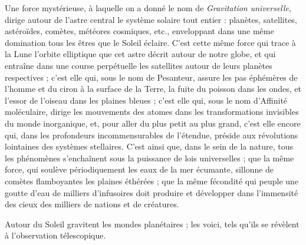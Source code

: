 \documentclass[a4paper, 11pt, oneside]{article}
\begin{document}
Une force mystérieuse, à laquelle on a donné le nom de \emph{Gravitation universelle}, dirige autour de l'astre central le système solaire tout entier : planètes, satellites, astéroïdes, comètes, météores cosmiques, etc., enveloppant dans une même domination tous les êtres que le Soleil éclaire. C'est cette même force qui trace à la Lune l'orbite elliptique que cet astre décrit autour de notre globe, et qui entraîne dans une course perpétuelle les satellites autour de leurs planètes respectives ; c'est elle qui, sous le nom de Pesanteur, assure les pas éphémères de l'homme et du ciron à la surface de la Terre, la fuite du poisson dans les ondes, et l'essor de l'oiseau dans les plaines bleues ; c'est elle qui, sous le nom d'Affinité moléculaire, dirige les mouvements des atomes dans les transformations invisibles du monde inorganique, et, pour aller du plus petit au plus grand, c'est elle encore qui, dans les profondeurs incommensurables de l'étendue, préside aux révolutions lointaines des systèmes stellaires. C'est ainsi que, dans le sein de la nature, tous les phénomènes s'enchaînent sous la puissance de lois universelles ; que la même force, qui soulève périodiquement les eaux de la mer écumante, sillonne de comètes flamboyantes les plaines éthérées ; que la même fécondité qui peuple une goutte d'eau de milliers d'infusoires doit produire et développer dans l'immensité des cieux des milliers de nations et de créatures.

Autour du Soleil gravitent les mondes planétaires ; les voici, tels qu'ils se révèlent à l'observation télescopique.
\end{document}
